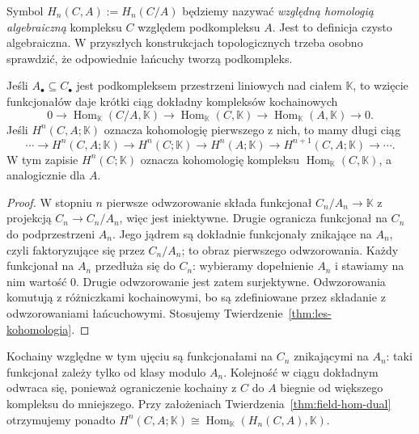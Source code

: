 Symbol $H_n(C,A):=H_n(C/A)$ będziemy
nazywać \emph{względną homologią
algebraiczną} kompleksu $C$ względem
podkompleksu $A$. Jest to definicja
czysto algebraiczna. W przyszłych
konstrukcjach topologicznych trzeba
osobno sprawdzić, że odpowiednie
łańcuchy tworzą podkompleks.

\begin{stwierdzenie}
\label{prop:wzgledna-kohomologia}
Jeśli $A_\bullet\subseteq C_\bullet$
jest podkompleksem przestrzeni liniowych
nad ciałem $\mathbb K$, to wzięcie
funkcjonałów daje krótki ciąg dokładny
kompleksów kochainowych
\[
 0\to\operatorname{Hom}_{\mathbb K}
      (C/A,\mathbb K)
 \to\operatorname{Hom}_{\mathbb K}(C,\mathbb K)
 \to\operatorname{Hom}_{\mathbb K}(A,\mathbb K)
 \to0.
\]
Jeśli $H^n(C,A;\mathbb K)$ oznacza
kohomologię pierwszego z nich, to mamy
długi ciąg
\[
 \cdots\to H^n(C,A;\mathbb K)\to H^n(C;\mathbb K)
 \to H^n(A;\mathbb K)\to H^{n+1}(C,A;\mathbb K)
 \to\cdots .
\]
W tym zapisie $H^n(C;\mathbb K)$
oznacza kohomologię kompleksu
$\operatorname{Hom}_{\mathbb K}(C,\mathbb K)$,
a analogicznie dla $A$.
\end{stwierdzenie}
\begin{proof}
W stopniu $n$ pierwsze odwzorowanie składa
funkcjonał $C_n/A_n\to\mathbb K$
z projekcją $C_n\to C_n/A_n$,
więc jest iniektywne.
Drugie ogranicza funkcjonał na $C_n$
do podprzestrzeni $A_n$.
Jego jądrem są dokładnie funkcjonały
znikające na $A_n$, czyli faktoryzujące
się przez $C_n/A_n$; to obraz
pierwszego odwzorowania. Każdy funkcjonał
na $A_n$ przedłuża się do $C_n$:
wybieramy dopełnienie $A_n$
i stawiamy na nim wartość $0$.
Drugie odwzorowanie jest zatem surjektywne.
Odwzorowania komutują z różniczkami
kochainowymi, bo są zdefiniowane
przez składanie z odwzorowaniami łańcuchowymi.
Stosujemy
Twierdzenie~\ref{thm:les-kohomologia}.
\end{proof}

Kochainy względne w tym ujęciu są funkcjonałami na $C_n$
znikającymi na $A_n$: taki funkcjonał zależy tylko od klasy
modulo $A_n$. Kolejność w ciągu dokładnym odwraca się,
ponieważ ograniczenie kochainy z $C$ do $A$ biegnie od
większego kompleksu do mniejszego. Przy założeniach
Twierdzenia~\ref{thm:field-hom-dual} otrzymujemy ponadto
$H^n(C,A;\mathbb K)\cong
\operatorname{Hom}_{\mathbb K}(H_n(C,A),\mathbb K)$.

